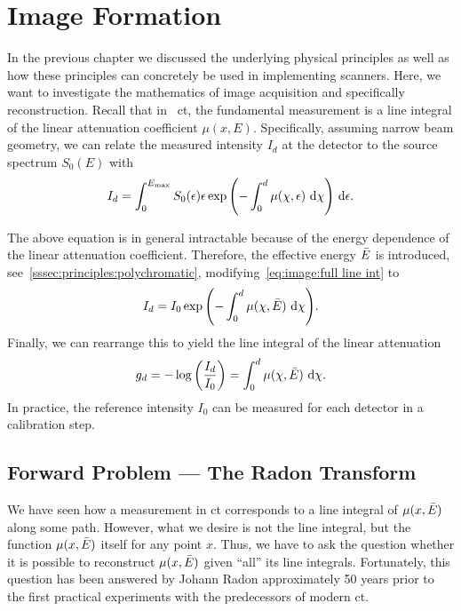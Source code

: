 \documentclass[../ml-ct.tex]{subfiles}
\begin{document}
\chapter{Image Formation}%
\label{chap:image-formation}

\minitoc%
In the previous chapter we discussed the underlying physical principles as well as how these principles can concretely be used in implementing scanners.
Here, we want to investigate the mathematics of image acquisition and specifically reconstruction.
Recall that in \xray\ \gls{ct}, the fundamental measurement is a line integral of the linear attenuation coefficient \( \mu(x, E) \).
Specifically, assuming narrow beam geometry, we can relate the measured intensity \( I_d \) at the detector to the source spectrum \( S_0(E) \) with
\begin{equation}
	I_d = \int_0^{E_{\text{max}}} S_0(\epsilon)\epsilon \exp{\left( -\int_0^d \mu(\chi, \epsilon)\ \mathrm{d}\chi  \right)}\ \mathrm{d} \epsilon.\label{eq:image:full line int}
\end{equation}

The above equation is in general intractable because of the energy dependence of the linear attenuation coefficient.
Therefore, the effective energy \( \bar{E} \) is introduced, see~\cref{sssec:principles:polychromatic}, modifying~\cref{eq:image:full line int} to
\begin{equation}
	I_d = I_0 \exp{\left( -\int_0^d \mu(\chi, \bar{E})\ \mathrm{d}\chi \right)}.
\end{equation}
Finally, we can rearrange this to yield the line integral of the linear attenuation
\begin{equation}
	g_d = -\log\left(\frac{I_d}{I_0}\right) = \int_0^d\mu(\chi,\bar{E})\ \mathrm{d} \chi.
\end{equation}
In practice, the reference intensity \( I_0 \) can be measured for each detector in a calibration step.
\section{Forward Problem --- The Radon Transform}%
\label{sec:image:forward}
We have seen how a measurement in \gls{ct} corresponds to a line integral of \( \mu(x, \bar{E}) \) along some path.
However,  what we desire is not the line integral, but the function \( \mu(x, \bar{E}) \) itself for any point \( x \).
Thus, we have to ask the question whether it is possible to reconstruct \( \mu(x, \bar{E}) \) given \enquote{all} its line integrals.
Fortunately, this question has been answered by Johann Radon approximately \num{50} years prior to the first practical experiments with the predecessors of modern \gls{ct}.
\end{document}
